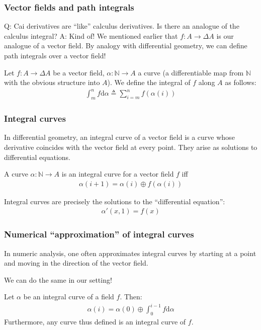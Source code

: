 \documentclass[english]{beamer}
\theoremstyle{plain}
\theoremstyle{remark}
\theoremstyle{remark}
\theoremstyle{remark}
\theoremstyle{definition}
\theoremstyle{definition}
\newcommand{\ra}[0]{\rightarrow}
\newcommand{\defeq}[0]{\triangleq}
\begin{document}
\begin{frame}
  \frametitle{Vector fields and path integrals}
  Q: Cai derivatives are ``like'' calculus derivatives. Is there an analogue of the calculus integral?
  A: Kind of!
  \vfill
  We mentioned earlier that $f : A \ra \Delta A$ is our analogue of a vector field. By analogy
  with differential geometry, we can define path integrals over a vector field!

  \begin{definition}
    Let $f : A \ra \Delta A$ be a vector field, $\alpha : \mathbb{N} \ra A$ a curve
    (a differentiable map from $\mathbb{N}$ with the obvious structure into $A$). We define the
    integral of $f$ along $A$ as follows:
    \begin{align*}
      \int_m^n f \text{d}\alpha \defeq \sum_{i = m}^n f(\alpha(i))
    \end{align*}
  \end{definition}
\end{frame}

\begin{frame}
  \frametitle{Integral curves}
  In differential geometry, an integral curve of a vector field is a curve whose derivative
  coincides with the vector field at every point. They arise as solutions to differential equations.
  \vfill
  \begin{definition}
    A curve $\alpha : \mathbb{N} \ra A$ is an integral curve for a vector field $f$ iff
    \begin{align*}
      \alpha(i + 1) = \alpha(i) \oplus f(\alpha(i))
    \end{align*}

  \end{definition}
  \begin{lemma}
    Integral curves are precisely the solutions to the ``differential equation'':
    \begin{align*}
      \alpha'(x, 1) = f(x)
    \end{align*}
  \end{lemma}
\end{frame}

\begin{frame}
  \frametitle{Numerical ``approximation'' of integral curves}
  In numeric analysis, one often approximates integral curves by starting at a point and moving
  in the direction of the vector field.

  We can do the same in our setting!
  \begin{lemma}
    Let $\alpha$ be an integral curve of a field $f$. Then:
    \begin{align*}
      \alpha(i) = \alpha(0) \oplus \int_0^{i - 1}f \text{d}\alpha
    \end{align*}
    Furthermore, any curve thus defined is an integral curve of $f$.
  \end{lemma}


\end{frame}
\end{document}
